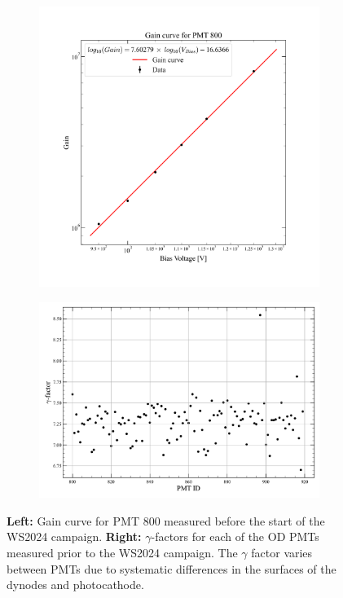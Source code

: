 \begin{figure}
     \begin{subfigure}[b]{0.44\textwidth}
         \centering
         \includegraphics[width=\textwidth]{figures/ODCommissioning/PMT800_GainCurve.png}
         \caption{}
         \label{fig:ODCommissioning/PMT800_gainCurve}
     \end{subfigure}
     \hfill
     \begin{subfigure}[b]{0.54\textwidth}
         \centering
         \includegraphics[width=\textwidth]{figures/ODCommissioning/gammaFactorScatterPlot.pdf}
         \caption{}
         \label{fig:ODCommissioning/gammaFactors}
     \end{subfigure}
        \caption[Gain curve for PMT 800 alongside the $\gamma$-factors for each of the OD PMTs measured prior to the WS2024 campaign.]{\textbf{Left:} Gain curve for PMT 800 measured before the start of the WS2024 campaign. \textbf{Right:} $\gamma$-factors for each of the OD PMTs measured prior to the WS2024 campaign. The $\gamma$ factor varies between PMTs due to systematic differences in the surfaces of the dynodes and photocathode.}
        \label{fig:ODCommissioning/gainCurve}
\end{figure}
\fi

